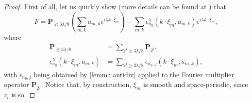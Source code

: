 \documentclass[10pt,a4paper]{amsart}
\numberwithin{equation}{section}
\numberwithin{corollario}{section}
\numberwithin{lemma}{section}
\numberwithin{prop}{section}
\theoremstyle{definition}
\theoremstyle{remark}
\newcommand{\proj}{\mathbf{P}}
\begin{document}
\begin{proof}
     First of all, let us quickly show (more details can be found at \cite{DLK23}) that
 \begin{equation}\label{e:decF}
     F=\proj_{\gtrsim3\lambda/8 }\left(\sum_{m,k}a_{m,k}e^{i\lambda k \cdot \xi_m}\right)-\sum_{m,k}\epsilon_{n_0}^{\lambda}(k\cdot \xi_m,a_{m,k})e^{i\lambda k\cdot \xi_m},
 \end{equation}
 where
 \begin{align}
     \proj_{\gtrsim3\lambda/8}&=\sum_{2^j\geq 3\lambda/8}\proj_{2^j},
     \\
     \epsilon_{n_0}^{\lambda}(k\cdot \xi_m,a_{m,k})&\label{e:epsN0L}=\sum_{2^j\geq 3\lambda/8}\epsilon_{n_0,j}(k\cdot \xi_m,a_{m,k}),
 \end{align}
with $\epsilon_{n_0,j}$ being obtained by \autoref{lemma:antidiv} applied to the Fourier multiplier operator $\proj_{2^j}$.
Notice that, by construction, $\xi_m$ is smooth and space-periodic, since $v_l$ is so.


\end{proof}
\end{document}
